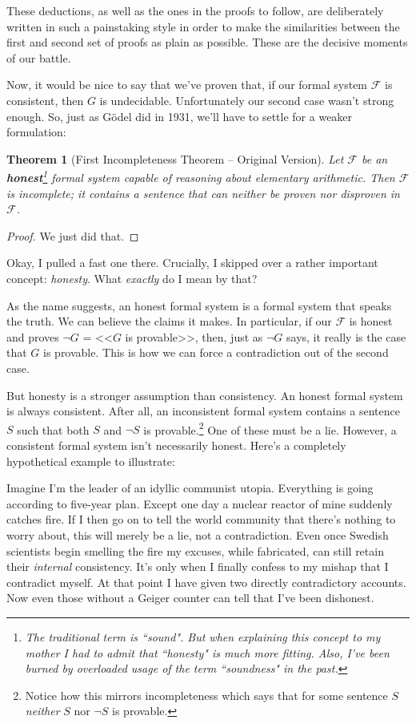 \documentclass{article}
\newtheorem{theorem}{Theorem}
\newcommand{\F}{\ensuremath{\mathcal{F}}}
\begin{document}
These deductions, as well as the ones in the proofs to follow, are deliberately written in such a painstaking style in order to make the similarities between the first and second set of proofs as plain as possible. These are the decisive moments of our battle.

Now, it would be nice to say that we've proven that, if our formal system $\F$ is consistent, then $G$ is undecidable. Unfortunately our second case wasn't strong enough. So, just as Gödel did in 1931, we'll have to settle for a weaker formulation:

\begin{theorem}[First Incompleteness Theorem -- Original Version]
Let $\F$ be an \textbf{honest}\footnote{The traditional term is ``\textit{sound}". But when explaining this concept to my mother I had to admit that ``honesty" is much more fitting. Also, I've been burned by overloaded usage of the term ``soundness" in the past.} formal system capable of reasoning about elementary arithmetic. Then $\F$ is incomplete; it contains a sentence that can neither be proven nor disproven in $\F$.
\end{theorem}

\begin{proof}
We just did that.
\end{proof}

Okay, I pulled a fast one there. Crucially, I skipped over a rather important concept: \textit{honesty}. What \textit{exactly} do I mean by that?

As the name suggests, an honest formal system is a formal system that speaks the truth. We can believe the claims it makes. In particular, if our $\F$ is honest and proves $\neg G$ = <<$G$ is provable>>, then, just as $\neg G$ says, it really is the case that $G$ is provable. This is how we can force a contradiction out of the second case.

But honesty is a stronger assumption than consistency. An honest formal system is always consistent. After all, an inconsistent formal system contains a sentence $S$ such that both $S$ and $\neg S$ is provable.\footnote{Notice how this mirrors incompleteness which says that for some sentence $S$ \textit{neither} $S$ nor $\neg S$ is provable.} One of these must be a lie. However, a consistent formal system isn't necessarily honest. Here's a completely hypothetical example to illustrate: 

Imagine I'm the leader of an idyllic communist utopia. Everything is going according to five-year plan. Except one day a nuclear reactor of mine suddenly catches fire. If I then go on to tell the world community that there's nothing to worry about, this will merely be a lie, not a contradiction. Even once Swedish scientists begin smelling the fire my excuses, while fabricated, can still retain their \textit{internal} consistency. It's only when I finally confess to my mishap that I contradict myself. At that point I have given two directly contradictory accounts. Now even those without a Geiger counter can tell that I've been dishonest.
\end{document}
